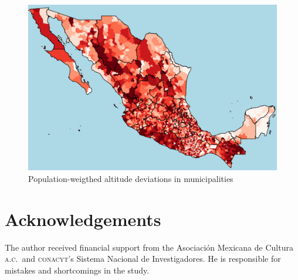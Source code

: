 \documentclass[letter,12pt]{article}
\begin{document}
\begin{figure}
  \centering
    \caption{Population-weigthed altitude deviations in municipalities}\label{F:avgMg}
    \includegraphics[width=.8\columnwidth]{../graph/map.png}
\end{figure}


\section*{Acknowledgements}
The author received financial support from the Asociaci\'on Mexicana de Cultura \textsc{a.c.}\ and \textsc{conacyt}'s Sistema Nacional de Investigadores. He is responsible for mistakes and shortcomings in the study.




\end{document}
